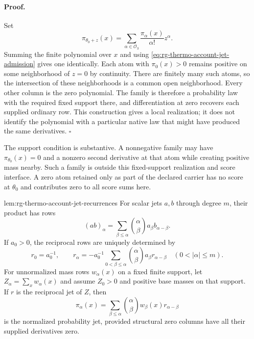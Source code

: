 \paragraph{Proof.}
Set
\begin{equation}
 \pi_{\theta_0+z}(x)
 =\sum_{\alpha\in\mathcal O_3}
              \frac{\pi_\alpha(x)}{\alpha!}z^\alpha.
 \label{eq:rg-thermo-account-jet-polynomial}
\end{equation}
Summing the finite polynomial over $x$ and using
\cref{eq:rg-thermo-account-jet-admission} gives one identically. Each
atom with $\pi_0(x)>0$ remains positive on some neighborhood of
$z=0$ by continuity. There are finitely many such atoms, so the
intersection of these neighborhoods is a common open neighborhood.
Every other column is the zero polynomial. The family is therefore a
probability law with the required fixed support there, and differentiation
at zero recovers each supplied ordinary row. This construction gives a
local realization; it does not identify the polynomial with a particular
native law that might have produced the same derivatives. $\square$

The support condition is substantive. A nonnegative family may have
$\pi_{\theta_0}(x)=0$ and a nonzero second derivative at that atom
while creating positive mass nearby. Such a family is outside this
fixed-support realization and score interface. A zero atom retained only
as part of the declared carrier has no score at $\theta_0$ and contributes
zero to all score sums here.

{lem:rg-thermo-account-jet-recurrences}
For scalar jets $a,b$ through degree $m$, their product has rows
\begin{equation}
 (ab)_\alpha=\sum_{\beta\leq\alpha}
       \binom\alpha\beta a_\beta b_{\alpha-\beta}.
 \label{eq:rg-thermo-account-jet-product}
\end{equation}
If $a_0>0$, the reciprocal rows are uniquely determined by
\begin{equation}
 r_0=a_0^{-1},\qquad
 r_\alpha=-a_0^{-1}
     \sum_{0<\beta\leq\alpha}
       \binom\alpha\beta a_\beta r_{\alpha-\beta}
       \quad(0<|\alpha|\leq m).
 \label{eq:rg-thermo-account-jet-reciprocal}
\end{equation}
For unnormalized mass rows $w_\alpha(x)$ on a fixed finite support,
let $Z_\alpha=\sum_xw_\alpha(x)$ and assume $Z_0>0$ and positive
base masses on that support. If $r$ is the reciprocal jet of $Z$, then
\begin{equation}
 \pi_\alpha(x)=\sum_{\beta\leq\alpha}
        \binom\alpha\beta w_\beta(x)r_{\alpha-\beta}
 \label{eq:rg-thermo-account-jet-normalization}
\end{equation}
is the normalized probability jet, provided structural zero columns have
all their supplied derivatives zero.\thermoestablishedstatus



